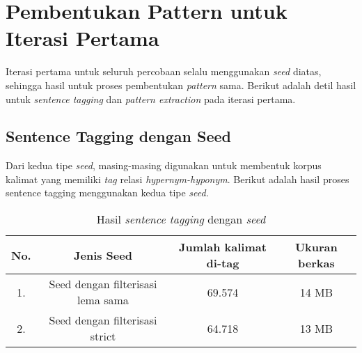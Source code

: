 \section{Pembentukan Pattern untuk Iterasi Pertama}
Iterasi pertama untuk seluruh percobaan selalu menggunakan \textit{seed} diatas, sehingga hasil untuk proses pembentukan \textit{pattern} sama. Berikut adalah detil hasil untuk \textit{sentence tagging} dan \textit{pattern extraction} pada iterasi pertama.

\subsection{Sentence Tagging dengan Seed}
Dari kedua tipe \textit{seed}, masing-masing digunakan untuk membentuk korpus kalimat yang memiliki \textit{tag} relasi \textit{hypernym-hyponym}. Berikut adalah hasil proses sentence tagging menggunakan kedua tipe \textit{seed}.
\begin{table}
  \centering
  \caption{Hasil \textit{sentence tagging} dengan \textit{seed}}
  \label{table:sentencetagging1}
  \begin{tabular}{|c|c|c|c|}
    \hline
      No. & Jenis Seed                        & Jumlah kalimat di-tag & Ukuran berkas \\ \hline
      1.  & Seed dengan filterisasi lema sama & 69.574                & 14 MB         \\ \hline
      2.  & Seed dengan filterisasi strict    & 64.718                & 13 MB         \\ \hline
  \end{tabular}
\end{table}

